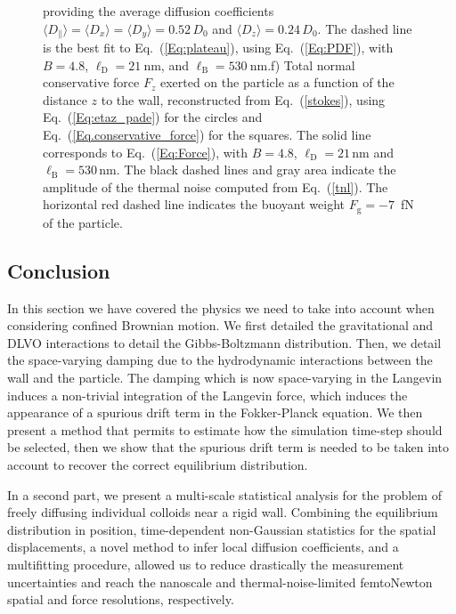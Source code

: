 \begin{figure}[H]
{		providing the average diffusion coefficients $\langle{D_\parallel}\rangle= \langle D_x\rangle=\langle D_y \rangle =0.52\,D_0$ and $\langle D_z \rangle =0.24\, D_0$. The dashed line is the best fit to Eq.~(\ref{Eq:plateau}), using Eq.~(\ref{Eq:PDF}), with $B = 4.8$, $\ell_\mathrm{D} = 21 ~ \mathrm{nm}$, and $\ell_\mathrm{B} = 530~\mathrm{nm}$.f) Total normal conservative force $F_z$ exerted on the particle as a function of the distance $z$ to the wall, reconstructed from Eq.~(\ref{stokes}), using Eq.~(\ref{Eq:etaz_pade}) for the circles and Eq.~(\ref{Eq.conservative_force}) for the squares. The solid line corresponds to Eq.~(\ref{Eq:Force}), with $B=4.8$, $\ell_{\mathrm{D}}=21\,\mathrm{nm}$ and $\ell_{\mathrm{B}}=530\,\mathrm{nm}$. The black dashed lines and gray area indicate the amplitude of the thermal noise computed from Eq.~(\ref{tnl}). The horizontal red dashed line indicates the buoyant weight $F_{\textrm{g}}=-7$~fN of the particle.}
	\label{fig.simconfined}
\end{figure}


\subsection{Conclusion}

In this section we have covered the physics we need to take into account when considering confined Brownian motion. We first detailed the gravitational and DLVO interactions to detail the Gibbs-Boltzmann distribution. Then, we detail the space-varying damping due to the hydrodynamic interactions between the wall and the particle. The damping which is now space-varying in the Langevin induces a non-trivial integration of the Langevin force, which induces the appearance of a spurious drift term in the Fokker-Planck equation. We then present a method that permits to estimate how the simulation time-step should be selected, then we show that the spurious drift term is needed to be taken into account to recover the correct equilibrium distribution.

In a second part, we present a multi-scale statistical analysis for the problem of freely diffusing individual colloids near a rigid wall. Combining the equilibrium distribution in position, time-dependent non-Gaussian statistics for the spatial displacements, a novel method to infer local diffusion coefficients, and a multifitting procedure, allowed us to reduce drastically the measurement uncertainties and reach the nanoscale and thermal-noise-limited femtoNewton spatial and force resolutions, respectively. 
